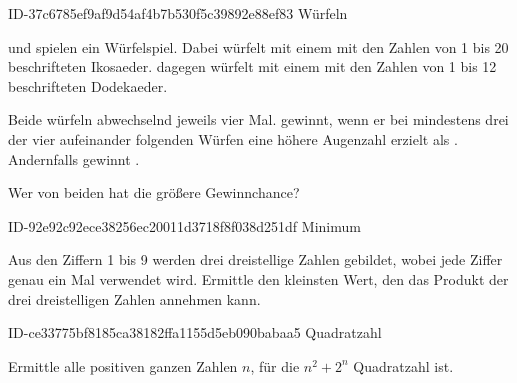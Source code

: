 \begin{exercise}
      {ID-37c6785ef9af9d54af4b7b530f5c39892e88ef83}
      {Würfeln}
  \ifproblem\problem\par
    \xya{} und \xyb{} spielen ein Würfelspiel.
    Dabei würfelt \xya{} mit einem mit den Zahlen
    von 1 bis 20 beschrifteten Ikosaeder.
    \xyb{} dagegen würfelt mit einem mit den Zahlen
    von 1 bis 12 beschrifteten Dodekaeder.
    \par
    Beide würfeln abwechselnd jeweils vier Mal.
    \xya{} gewinnt, wenn er bei mindestens drei
    der vier aufeinander folgenden Würfen eine
    höhere Augenzahl erzielt als \xyb. Andernfalls
    gewinnt \xyb.
    \par
    Wer von beiden hat die größere Gewinnchance?
  \fi
\end{exercise}

\begin{exercise}
      {ID-92e92c92ece38256ec20011d3718f8f038d251df}
      {Minimum}
  \ifproblem\problem\par
    Aus den Ziffern 1 bis 9 werden drei dreistellige
    Zahlen gebildet, wobei jede Ziffer genau ein Mal
    verwendet wird. Ermittle den kleinsten Wert,
    den das Produkt der drei dreistelligen Zahlen
    annehmen kann.
  \fi
\end{exercise}

\begin{exercise}
      {ID-ce33775bf8185ca38182ffa1155d5eb090babaa5}
      {Quadratzahl}
  \ifproblem\problem\par
    Ermittle alle positiven ganzen Zahlen $n$, für die
    $n^{2}+2^{n}$ Quadratzahl ist.
  \fi
\end{exercise}



